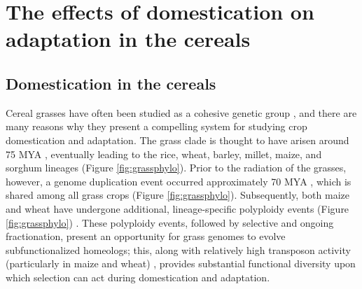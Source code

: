 \documentclass[12pt]{article}
\begin{document}
\section*{The effects of domestication on adaptation in the cereals}

\subsection*{Domestication in the cereals}
Cereal grasses have often been studied as a cohesive genetic group \citep{pmid8379002, pmid11244100}, and there are many reasons why they present a compelling system for studying crop domestication and adaptation.
The grass clade is thought to have arisen around 75 MYA \citep{BOUCHENAKKHELLADI2010, Kellogg2001}, eventually leading to the rice, wheat, barley, millet, maize, and sorghum lineages (Figure \ref{fig:grassphylo}).
Prior to the radiation of the grasses, however, a genome duplication event occurred approximately 70 MYA \citep{Paterson2004}, which is shared among all grass crops (Figure \ref{fig:grassphylo}).
Subsequently, both maize and wheat have undergone additional, lineage-specific polyploidy events (Figure \ref{fig:grassphylo}) \citep{Levy2002}.
These polyploidy events, followed by selective and ongoing fractionation, present an opportunity for grass genomes to evolve subfunctionalized homeologs; this, along with relatively high transposon activity (particularly in maize and wheat) \citep{Wicker2016, Lisch2001}, provides substantial functional diversity upon which selection can act during domestication and adaptation.
\end{document}
